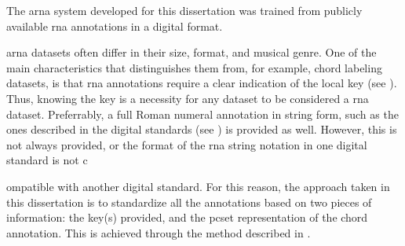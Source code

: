 

The \gls{arna} system developed for this dissertation was
trained from publicly available \gls{rna} annotations in a
digital format. 

\gls{arna} datasets often  differ in their size, format, and
musical genre. One of the main characteristics that
distinguishes them from, for example, chord labeling
datasets, is that \gls{rna} annotations require a clear
indication of the local key (see ).
Thus, knowing the key is a necessity for any dataset to be
considered a \gls{rna} dataset. Preferrably, a full Roman
numeral annotation in string form, such as the ones
described in the digital standards (see
) is provided as well.
However, this is not always provided, or the format of the
\gls{rna} string notation in one digital standard is not c

ompatible with another digital standard. For this reason,
the approach taken in this dissertation is to standardize
all the annotations based on two pieces of information: the
key(s) provided, and the \gls{pcset} representation of the
chord annotation. This is achieved through the method
described in
.
